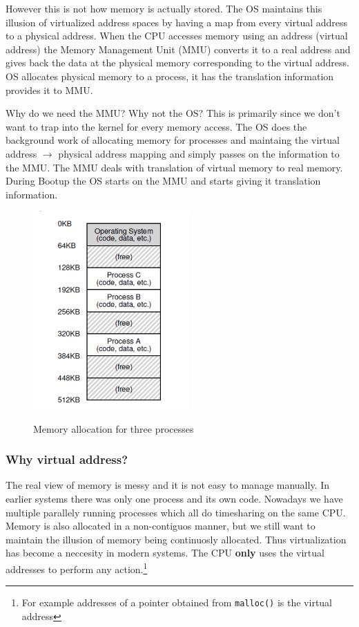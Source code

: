 \documentclass[12pt]{article}
\begin{document}
However this is not how memory is actually stored. The OS maintains this illusion of virtualized address spaces by having a map from every virtual address to a physical address. When the CPU accesses memory 
using an address (virtual address) the Memory Management Unit (MMU) converts it to a real address and gives back the data at the physical memory corresponding to the virtual address. OS allocates physical memory to a process, it has the translation information
provides it to MMU.

Why do we need the MMU? Why not the OS? This is primarily since we don't want to trap into the kernel for every memory access. The OS does the background work
of allocating memory for processes and maintaing the virtual address $\rightarrow$ physical address mapping and simply passes on the information to the MMU.
The MMU deals with translation of virtual memory to real memory. During Bootup the OS starts on the MMU and starts giving it translation information.

\begin{figure}
    \begin{center}
        \includegraphics[width = 6cm]{memory_allocation.png}
        \label{figure:memory_alloc}
        \caption{Memory allocation for three processes}
    \end{center}
\end{figure}


\subsubsection*{Why virtual address?}
The real view of memory is messy and it is not easy to manage manually. In earlier systems there was only one process and its own code. Nowadays we have multiple
parallely running processes which all do time\-sharing on the same CPU. Memory is also allocated in a non-contiguos manner, but we still want to maintain the illusion of memory being continuosly allocated. 
Thus virtualization has become a neccesity in modern systems. The CPU \textbf{only} uses the virtual addresses to perform any action.\footnote{For example addresses of a pointer obtained from \texttt{malloc()} is the virtual address}
\end{document}
